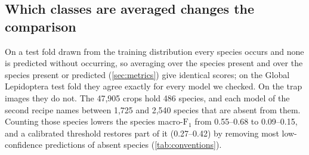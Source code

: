 \subsection{Which classes are averaged changes the comparison}\label{sec:results_conventions}
On a test fold drawn from the training distribution every species occurs and none is predicted without occurring, so averaging over the species present and over the species present or predicted (\cref{sec:metrics}) give identical scores; on the Global Lepidoptera test fold they agree exactly for every model we checked.
On the trap images they do not.
The 47,905 crops hold 486 species, and each model of the second recipe names between 1,725 and 2,540 species that are absent from them.
Counting those species lowers the species macro-$\text{F}_1$ from 0.55--0.68 to 0.09--0.15, and a calibrated threshold restores part of it (0.27--0.42) by removing most low-confidence predictions of absent species (\cref{tab:conventions}).

